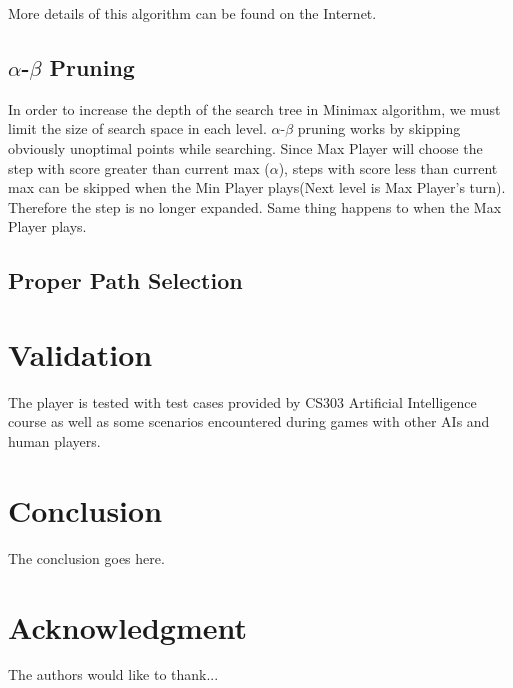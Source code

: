 \documentclass[conference]{IEEEtran}
\begin{document}
More details of this algorithm can be found on the Internet. 

\subsection{$\alpha$-$\beta$ Pruning}
In order to increase the depth of the search tree in Minimax algorithm, we must limit the size of search space in each level. $\alpha$-$\beta$ pruning works by skipping obviously unoptimal points while searching. Since Max Player will choose the step with score greater than current max ($\alpha$), steps with score less than current max can be skipped when the Min Player plays(Next level is Max Player's turn). Therefore the step is no longer expanded. Same thing happens to when the Max Player plays.

\subsection{Proper Path Selection}

\section{Validation}
	The player is tested with test cases provided by CS303 Artificial Intelligence course as well as some scenarios encountered during games with other AIs and human players. 

  \section{Conclusion}
  The conclusion goes here.

  \section*{Acknowledgment}

  The authors would like to thank...
  
  
  
  
  
  
\end{document}
